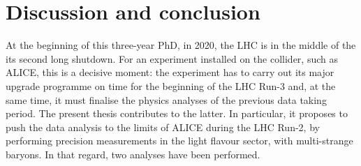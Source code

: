 \chapter{Discussion and conclusion}
\label{chap:Conclusion}

At the beginning of this three-year PhD, in 2020, the LHC is in the middle of the its second long shutdown. For an experiment installed on the collider, such as ALICE, this is a decisive moment: the experiment has to carry out its major upgrade programme on time for the beginning of the LHC Run-3 and, at the same time, it must finalise the physics analyses of the previous data taking period. The present thesis contributes to the latter. In particular, it proposes to push the data analysis to the limits of ALICE during the LHC Run-2, by performing precision measurements in the light flavour sector, with multi-strange baryons. In that regard, two analyses have been performed.\\


